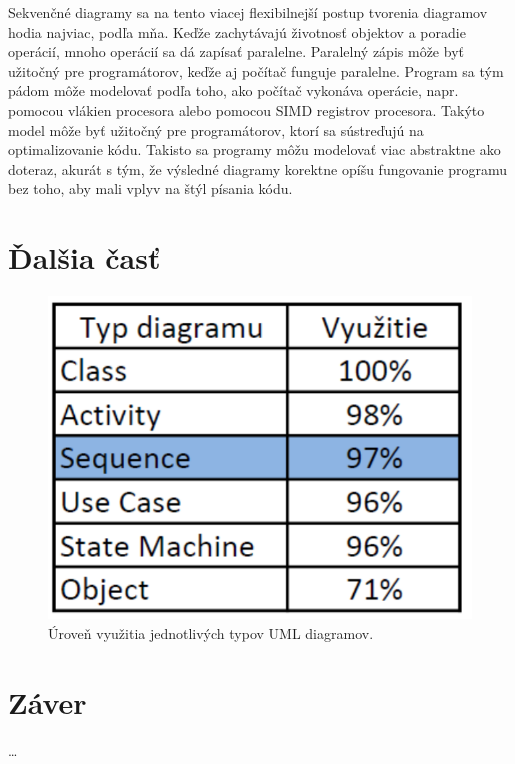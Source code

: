 \documentclass[10pt,twoside,slovak,a4paper]{article}
\begin{document}
\noindent Sekvenčné diagramy sa na tento viacej flexibilnejší postup tvorenia diagramov hodia najviac, podľa mňa. Keďže zachytávajú životnosť objektov a poradie operácií, mnoho operácií sa dá zapísať paralelne. Paralelný zápis môže byť užitočný pre programátorov, keďže aj počítač funguje paralelne. 
Program sa tým pádom môže modelovať podľa toho, ako počítač vykonáva operácie, napr. pomocou vlákien procesora alebo pomocou SIMD registrov procesora. Takýto model môže byť užitočný pre programátorov, ktorí sa sústreďujú na optimalizovanie kódu. 
Takisto sa programy môžu modelovať viac abstraktne ako doteraz, akurát s tým, že výsledné diagramy korektne opíšu fungovanie programu bez toho, aby mali vplyv na štýl písania kódu. \newline

\section{Ďalšia časť}

\begin{figure}[tbh]
\centering
\includegraphics[scale=0.7]{tab.pdf}
\caption{Úroveň využitia jednotlivých typov UML diagramov. \cite{reggio13}}
\end{figure}

\section{Záver}
\ldots




\end{document}
